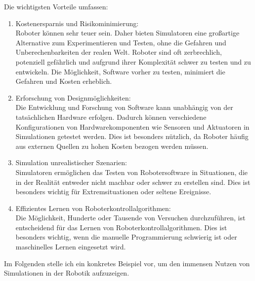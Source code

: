 \documentclass[german,version-2020-11]{uzl-thesis}
\begin{document}
Die wichtigsten Vorteile umfassen:
\begin{enumerate}
  \item Kostenersparnis und Risikominimierung: \\
  Roboter können sehr teuer sein. Daher bieten Simulatoren eine großartige Alternative zum Experimentieren und Testen, ohne die Gefahren und Unberechenbarkeiten der realen Welt. 
  Roboter sind oft zerbrechlich, potenziell gefährlich und aufgrund ihrer Komplexität schwer zu testen und zu entwickeln. 
  Die Möglichkeit, Software vorher zu testen, minimiert die Gefahren und Kosten erheblich.
  \item Erforschung von Designmöglichkeiten:\\
    Die Entwicklung und Forschung von Software kann unabhängig von der tatsächlichen Hardware erfolgen. 
    Dadurch können verschiedene Konfigurationen von Hardwarekomponenten wie Sensoren und Aktuatoren in Simulationen getestet werden. 
    Dies ist besonders nützlich, da Roboter häufig aus externen Quellen zu hohen Kosten bezogen werden müssen.
  \item Simulation unrealistischer Szenarien:\\
  Simulatoren ermöglichen das Testen von Robotersoftware in Situationen, die in der Realität entweder nicht machbar oder schwer zu erstellen sind. 
  Dies ist besonders wichtig für Extremsituationen oder seltene Ereignisse.
  \item Effizientes Lernen von Roboterkontrollalgorithmen:\\
Die Möglichkeit, Hunderte oder Tausende von Versuchen durchzuführen, ist entscheidend für das Lernen von Roboterkontrollalgorithmen. 
Dies ist besonders wichtig, wenn die manuelle Programmierung schwierig ist oder maschinelles Lernen eingesetzt wird.
\end{enumerate}


Im Folgenden stelle ich ein konkretes Beispiel vor, um den immensen Nutzen von Simulationen in der Robotik aufzuzeigen.
\end{document}
